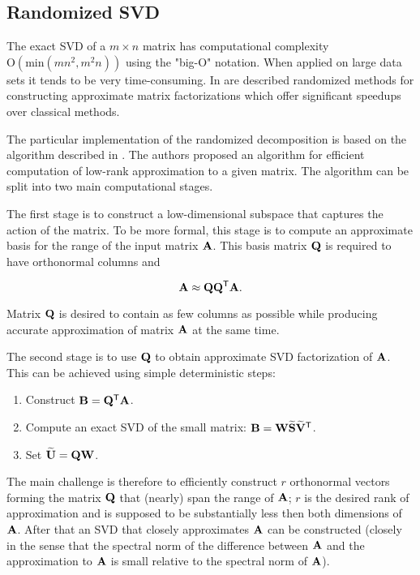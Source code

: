 \subsection{Randomized SVD}

The exact SVD of a $m \times n$ matrix has computational complexity \newline $\mathrm{O}(\mathrm{min}(mn^2, m^2n))$ using the "big-O" notation. When applied on large data sets it tends to be very time-consuming. In \cite{Candes2011, Woolfe2008, Martinsson2011, Szlam2014} are described randomized methods for constructing approximate matrix factorizations which offer significant speedups over classical methods.

The particular implementation of the randomized decomposition is based on the algorithm described in \cite{Halko2011}. The authors proposed an algorithm for efficient computation of low-rank approximation to a given matrix. The algorithm can be split into two main computational stages.

The first stage is to construct a low-dimensional subspace that captures the action of the matrix. To be more formal, this stage is to compute an approximate basis for the range of the input matrix $\mathbf{A}$. This basis matrix $\mathbf{Q}$ is required to have orthonormal columns and

\begin{equation}
\mathbf{A} \approx \mathbf{Q} \mathbf{Q}^{\mathsf{T}} \mathbf{A}.
\end{equation}

\noindent
Matrix $\mathbf{Q}$ is desired to contain as few columns as possible while producing accurate approximation of matrix $\mathbf{A}$ at the same time.

The second stage is to use $\mathbf{Q}$ to obtain approximate SVD factorization of $\mathbf{A}$. This can be achieved using simple deterministic steps:

\begin{enumerate}
\item Construct $\mathbf{B} = \mathbf{Q}^{\mathsf{T}} \mathbf{A}$.
\item Compute an exact SVD of the small matrix: $\mathbf{B}=\mathbf{W}\mathbf{\widetilde{S}}\mathbf{\widetilde{V}}^{\mathsf{T}}$.
\item Set $\mathbf{\widetilde{U}}=\mathbf{Q}\mathbf{W}$.
\end{enumerate}

The main challenge is therefore to efficiently construct $r$ orthonormal vectors forming the matrix $\mathbf{Q}$ that (nearly) span the range of $\mathbf{A}$; $r$ is the desired rank of approximation and is supposed to be substantially less then both dimensions of $\mathbf{A}$. After that an SVD that closely approximates $\mathbf{A}$ can be constructed (closely in the sense that the spectral norm of the difference between $\mathbf{A}$ and the approximation to $\mathbf{A}$ is small relative to the spectral norm of $\mathbf{A}$).

